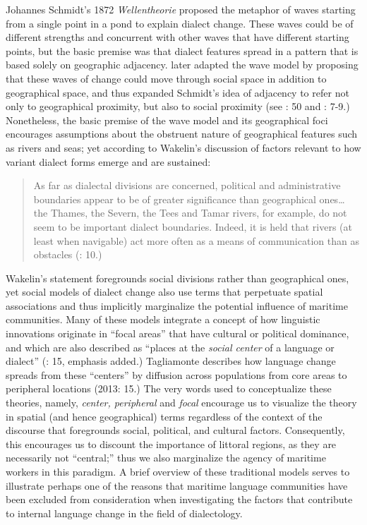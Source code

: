 Johannes Schmidt’s 1872 \textit{Wellentheorie} proposed the metaphor of waves starting from a single point in a pond to explain dialect change. These waves could be of different strengths and concurrent with other waves that have different starting points, but the basic premise was that dialect features spread in a pattern that is based solely on geographic adjacency. \citet{BaileyEtAl1993} later adapted the wave model by proposing that these waves of change could move through social space in addition to geographical space, and thus expanded Schmidt’s idea of adjacency to refer not only to geographical proximity, but also to social proximity (see \citealt{Petyt1980}: 50 and \citealt{AuerEtAl2005}: 7-9.) Nonetheless, the basic premise of the wave model and its geographical foci encourages assumptions about the obstruent nature of geographical features such as rivers and seas; yet according to Wakelin’s discussion of factors relevant to how variant dialect forms emerge and are sustained: 

\begin{quotation}
As far as dialectal divisions are concerned, political and administrative boundaries appear to be of greater significance than geographical ones… the Thames, the Severn, the Tees and Tamar rivers, for example, do not seem to be important dialect boundaries. Indeed, it is held that rivers (at least when navigable) act more often as a means of communication than as obstacles (\citealt{Wakelin1977}: 10.)\end{quotation}

Wakelin’s statement foregrounds social divisions rather than geographical ones, yet social models of dialect change also use terms that perpetuate spatial associations and thus implicitly marginalize the potential influence of maritime communities. Many of these models integrate a concept of how linguistic innovations originate in “focal areas” that have cultural or political dominance, and which are also described as “places at the \textit{social center} of a language or dialect” (\citealt{Tagliamonte2013}: 15, emphasis added.) Tagliamonte describes how language change spreads from these “centers” by diffusion across populations from core areas to peripheral locations (2013: 15.) The very words used to conceptualize these theories, namely, \textit{center, peripheral} and \textit{focal} encourage us to visualize the theory in spatial (and hence geographical) terms regardless of the context of the discourse that foregrounds social, political, and cultural factors. Consequently, this encourages us to discount the importance of littoral regions, as they are necessarily not “central;” thus we also marginalize the agency of maritime workers in this paradigm. A brief overview of these traditional models serves to illustrate perhaps one of the reasons that maritime language communities have been excluded from consideration when investigating the factors that contribute to internal language change in the field of dialectology. 

